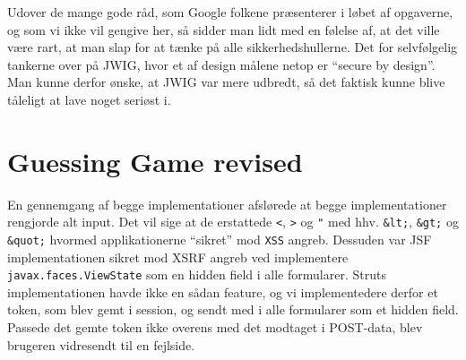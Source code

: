 \documentclass[a4paper,10pt]{article}
\begin{document}
Udover de mange gode råd, som Google folkene præsenterer i løbet af opgaverne, og som vi ikke vil gengive her, så sidder man lidt med en følelse af, at det ville være rart, at man slap for at tænke på alle sikkerhedshullerne. Det for selvfølgelig tankerne over på JWIG, hvor et af design målene netop er ``secure by design''. Man kunne derfor ønske, at JWIG var mere udbredt, så det faktisk kunne blive tåleligt at lave noget seriøst i.
\section*{Guessing Game revised}
En gennemgang af begge implementationer afslørede at begge implementationer rengjorde alt input. Det vil sige at de erstattede \texttt{<},  \texttt{>} og  \texttt{"}  med hhv. \texttt{\&lt;}, \texttt{\&gt;} og \texttt{\&quot;} hvormed applikationerne ``sikret'' mod \texttt{XSS} angreb. Dessuden var JSF implementationen sikret mod XSRF angreb ved implementere \texttt{javax.faces.ViewState} som en hidden field i alle formularer. Struts implementationen havde ikke en sådan feature, og vi implementedere derfor et token, som blev gemt i session, og sendt med i alle formularer som et hidden field. Passede det gemte token ikke overens med det modtaget i POST-data, blev brugeren vidresendt til en fejlside. 
\end{document}
